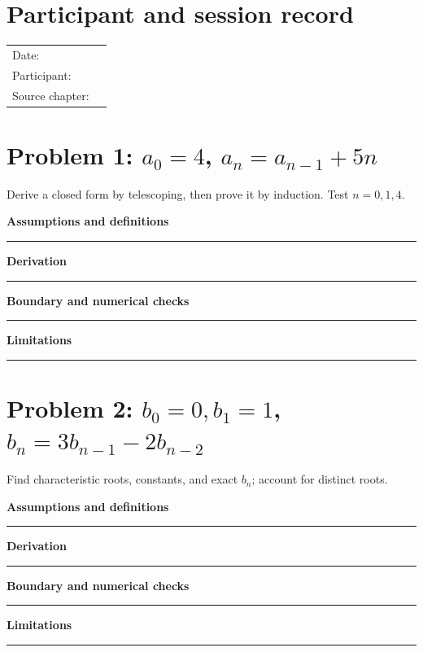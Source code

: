 \documentclass[11pt]{article}
\begin{document}
\makedoctitle
\section{Participant and session record}
\begin{tabularx}{\linewidth}{@{}lX@{}}Date: & \hrulefill\\ Participant: & \hrulefill\\ Source chapter: & \hrulefill\\\end{tabularx}
\section{\texorpdfstring{Problem 1: $a_0=4$, $a_n=a_{n-1}+5n$}{Problem 1: First-order recurrence with increment 5n}}
Derive a closed form by telescoping, then prove it by induction. Test $n=0,1,4$.\par\medskip
\textbf{Assumptions and definitions}\par\vspace{0.7cm}\hrule\vspace{0.35cm}
\textbf{Derivation}\par\vspace{2.1cm}\hrule\vspace{0.3cm}
\textbf{Boundary and numerical checks}\par\vspace{1.1cm}\hrule\vspace{0.35cm}
\textbf{Limitations}\par\vspace{0.9cm}\hrule\vspace{0.35cm}
\section{\texorpdfstring{Problem 2: $b_0=0,b_1=1$, $b_n=3b_{n-1}-2b_{n-2}$}{Problem 2: Second-order linear recurrence}}
Find characteristic roots, constants, and exact $b_n$; account for distinct roots.\par\medskip
\textbf{Assumptions and definitions}\par\vspace{0.7cm}\hrule\vspace{0.35cm}
\textbf{Derivation}\par\vspace{2.1cm}\hrule\vspace{0.3cm}
\textbf{Boundary and numerical checks}\par\vspace{1.1cm}\hrule\vspace{0.35cm}
\textbf{Limitations}\par\vspace{0.9cm}\hrule\vspace{0.35cm}
\end{document}
